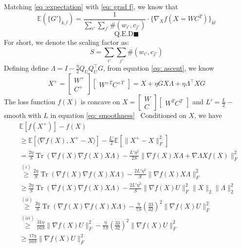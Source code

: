 \documentclass[letterpaper]{article} %
\DeclareMathOperator{\Tr}{Tr} %
\begin{document}
Matching \ref{eq :expectation} with \ref{eq: grad f}, we know that
\begin{equation}
\mathbb{E}(\{G'\}_{k,l})=\frac{1}{\sum_{i'}\sum_{j'} \#(w_{i'}, c_{j'})}\cdot \{\nabla_X f(X=WC^T)\}_{kl} \label{eq: scaling}
\end{equation} 
\[
\text{Q.E.D}\blacksquare
\]
For short, we denote the scaling factor as:
\begin{equation}
S={\sum_{i'}\sum_{j'} \#(w_{i'}, c_{j'})}
\end{equation}
Defining define $\Lambda=I-\frac{\eta}{2}Q_UQ_U^\top G$, from equation \ref{eq: ascent}, we know
\begin{equation}
X^+=\begin{bmatrix}W^+\\C^+\end{bmatrix}\begin{bmatrix}W^{+T}C^{+T}\end{bmatrix}=X+\eta GX\Lambda+\eta\Lambda^\top XG
\end{equation}
The loss function $f(X)$ is concave on $X=\begin{bmatrix}W\\C\end{bmatrix}\begin{bmatrix}W^{T} C^{T}\end{bmatrix}$ and $L'=\frac{L}{2}-$ smooth with $L$ in equation \ref{eq: smoothness}
\
Conditioned on $X$, we have
\begin{equation}
\begin{split}
&\mathbb{E}[f(X^+)]-f(X)\\&\ge \mathbb{E}[\langle \nabla f(X), X^+-X \rangle]-\frac{L'}{2}\mathbb{E}[\|X^+-X\|_F^2] \\
&=\frac{2\eta}{S}\Tr(\nabla f(X)\nabla f(X)X\Lambda)-\frac{L'\eta^2}{2S}\|\nabla f(X)X\Lambda+\nabla \Lambda Xf(X)\|^2_F\\
&\overset{(i)}{\ge}\frac{2\eta}{S}\Tr(\nabla f(X)\nabla f(X)X\Lambda)-\frac{2L'\eta^2}{S}\|\nabla f(X)X\Lambda\|^2_F\\
&\ge\frac{2\eta}{S}\Tr(\nabla f(X)\nabla f(X)X\Lambda)-\frac{2L'\eta^2}{S}\|\nabla f(X)U\|^2_F\|X\|_2\|\Lambda\|^2_2\\
&\overset{(ii)}{\ge}\frac{2\eta}{S}\Tr(\nabla f(X)\nabla f(X)X\Lambda)-\frac{\eta}{7S}(\frac{33}{32})^2\|\nabla f(X)U\|^2_F\\
&\overset{(iii)}{\ge}\frac{31\eta}{16S}\|\nabla f(X)U\|^2_F-\frac{\eta}{7S}(\frac{33}{32})^2\|\nabla f(X)U\|^2_F\\
&\ge\frac{17\eta}{10S}\|\nabla f(X)U\|^2_F
\end{split}
\end{equation}
\end{document}

